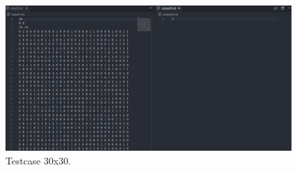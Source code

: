 \begin{figure}[H]
\centering
\includegraphics[width=0.98\textwidth]{t9.png}
\caption{Testcase 30x30.}
\end{figure}

\newpage